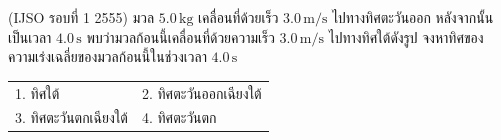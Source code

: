 (IJSO รอบที่ 1 2555) มวล $5.0\,\mathrm{kg}$ เคลื่อนที่ด้วยเร็ว $3.0\,\mathrm{m/s}$ ไปทางทิศตะวันออก หลังจากนั้นเป็นเวลา $4.0\,\mathrm{s}$ พบว่ามวลก้อนนี้เคลื่อนที่ด้วยความเร็ว $3.0\,\mathrm{m/s}$ ไปทางทิศใต้ดังรูป จงหาทิศของความเร่งเฉลี่ยของมวลก้อนนี้ในช่วงเวลา $4.0\,\mathrm{s}$
\begin{center}\end{center}
\par\smallskip\par\smallskip\begin{tabular}{@{}p{.48\linewidth}p{.48\linewidth}@{}}1. ทิศใต้ & 2. ทิศตะวันออกเฉียงใต้ \\ 3. ทิศตะวันตกเฉียงใต้ & 4. ทิศตะวันตก\end{tabular}
